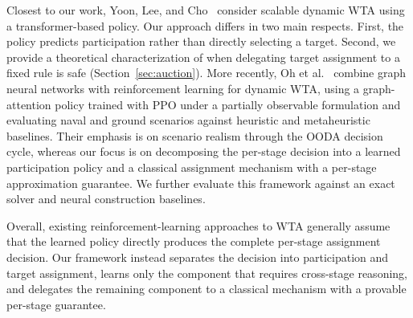 Closest to our work, Yoon, Lee, and Cho~\cite{yoontransformer} consider scalable dynamic WTA using a transformer-based policy. Our approach differs in two main respects. First, the policy predicts participation rather than directly selecting a target. Second, we provide a theoretical characterization of when delegating target assignment to a fixed rule is safe (Section~\ref{sec:auction}). More recently, Oh et al.~\cite{oh2026combat} combine graph neural networks with reinforcement learning for dynamic WTA, using a graph-attention policy trained with PPO under a partially observable formulation and evaluating naval and ground scenarios against heuristic and metaheuristic baselines. Their emphasis is on scenario realism through the OODA decision cycle, whereas our focus is on decomposing the per-stage decision into a learned participation policy and a classical assignment mechanism with a per-stage approximation guarantee. We further evaluate this framework against an exact solver and neural construction baselines.

Overall, existing reinforcement-learning approaches to WTA generally assume that the learned policy directly produces the complete per-stage assignment decision. Our framework instead separates the decision into participation and target assignment, learns only the component that requires cross-stage reasoning, and delegates the remaining component to a classical mechanism with a provable per-stage guarantee.


